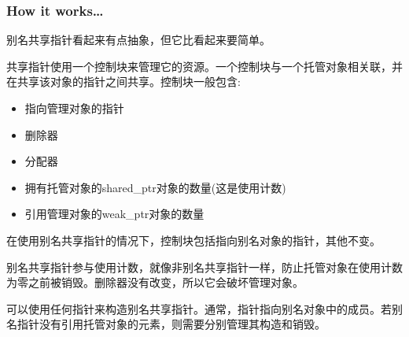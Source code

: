 \subsubsection{How it works…}

别名共享指针看起来有点抽象，但它比看起来要简单。

共享指针使用一个控制块来管理它的资源。一个控制块与一个托管对象相关联，并在共享该对象的指针之间共享。控制块一般包含:

\begin{itemize}
\item 
指向管理对象的指针

\item 
删除器

\item 
分配器

\item 
拥有托管对象的shared\_ptr对象的数量(这是使用计数)

\item 
引用管理对象的weak\_ptr对象的数量
\end{itemize}

在使用别名共享指针的情况下，控制块包括指向别名对象的指针，其他不变。

别名共享指针参与使用计数，就像非别名共享指针一样，防止托管对象在使用计数为零之前被销毁。删除器没有改变，所以它会破坏管理对象。

\begin{tcolorbox}[colback=webgreen!5!white,colframe=webgreen!75!black,title=重要的Note]
可以使用任何指针来构造别名共享指针。通常，指针指向别名对象中的成员。若别名指针没有引用托管对象的元素，则需要分别管理其构造和销毁。
\end{tcolorbox}




























